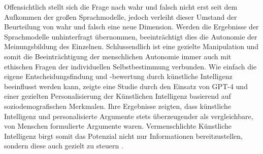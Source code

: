 Offensichtlich stellt sich die Frage nach wahr und falsch nicht erst seit dem Aufkommen der großen Sprachmodelle, jedoch verleiht dieser Umstand der Beurteilung von wahr und falsch eine neue Dimension. Werden die Ergebnisse der Sprachmodelle unhinterfragt übernommen, beeinträchtigt dies die Autonomie der Meinungsbildung des Einzelnen.
Schlussendlich ist eine gezielte Manipulation und somit die Beeinträchtigung der menschlichen Autonomie immer auch mit ethischen Fragen der individuellen Selbstbestimmung verbunden. Wie einfach die eigene Entscheidungsfindung und -bewertung durch künstliche Intelligenz beeinflusst werden kann, zeigte eine Studie durch den Einsatz von GPT-4 und einer gezielten Personalisierung der Künstlichen Intelligenz basierend auf soziodemografischen Merkmalen. Ihre Ergebnisse zeigten, dass künstliche Intelligenz und personalisierte Argumente stets überzeugender als vergleichbare, von Menschen formulierte Argumente waren. Vermenschlichte Künstliche Intelligenz birgt somit das Potenzial nicht nur Informationen bereitzustellen, sondern diese auch gezielt zu steuern \autocite{Salvi_Ribeiro_Gallotti_West_2025}.


